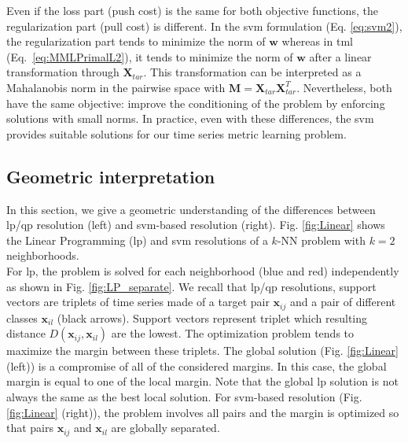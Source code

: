 \indent Even if the loss part (push cost) is the same for both objective functions, the regularization part (pull cost) is different. In the {\sc svm} formulation (Eq. \ref{eq:svm2}), the regularization part tends to minimize the norm of $\textbf{w}$ whereas in {\sc tml} (Eq.~\ref{eq:MMLPrimalL2}), it tends to minimize the norm of $\textbf{w}$ after a linear transformation through $\textbf{X}_{tar}$. This transformation can be interpreted as a Mahalanobis norm in the pairwise space with $\textbf{M}=\textbf{X}_{tar}\textbf{X}_{tar}^T$. Nevertheless, both have the same objective: improve the conditioning of the problem by enforcing solutions with small norms. In practice, even with these differences, the {\sc svm} provides suitable solutions for our time series metric learning problem. \\


\newpage
\subsection{Geometric interpretation}
In this section, we give a geometric understanding of the differences between {\sc lp}/{\sc qp} resolution (left) and {\sc svm}-based resolution (right). Fig. \ref{fig:Linear} shows the Linear Programming ({\sc lp}) and {\sc svm} resolutions of a $k$-NN problem with $k=2$ neighborhoods. \\

For {\sc lp}, the problem is solved for each neighborhood (blue and red) independently as shown in Fig. \ref{fig:LP_separate}. We recall that {\sc lp}/{\sc qp} resolutions, support vectors are triplets of time series made of a target pair $\textbf{x}_{ij}$ and a pair of different classes $\textbf{x}_{il}$ (black arrows). Support vectors represent triplet which resulting distance $D(\textbf{x}_{ij}, \textbf{x}_{il})$ are the lowest. The optimization problem tends to maximize the margin between these triplets. The global solution (Fig. \ref{fig:Linear} (left)) is a compromise of all of the considered margins. In this case, the global margin is equal to one of the local margin. Note that the global {\sc lp} solution is not always the same as the best local solution. For {\sc svm}-based resolution (Fig. \ref{fig:Linear} (right)), the problem involves all pairs and the margin is optimized so that pairs $\textbf{x}_{ij}$ and $\textbf{x}_{il}$ are globally separated.



